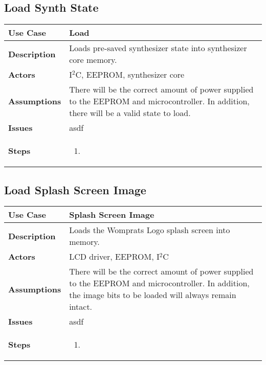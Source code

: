 \documentclass{article}
\begin{document}
\subsection{Load Synth State}
\begin{tabular}{|p{1in}|p{5in}|}
\hline
\textbf{Use Case} & Load\\
\hline
\textbf{Description} & Loads pre-saved synthesizer state into synthesizer core memory.\\
\hline
\textbf{Actors} & I$^{2}$C, EEPROM, synthesizer core\\
\hline
\textbf{Assumptions} & There will be the correct amount of power supplied to the EEPROM and microcontroller.  In addition, there will be a valid state to load.\\
\hline
\textbf{Issues} & asdf\\
\hline
\textbf{Steps} & \begin{enumerate}
\item
\end{enumerate}\\
\hline
\end{tabular}

\subsection{Load Splash Screen Image}
\begin{tabular}{|p{1in}|p{5in}|}
\hline
\textbf{Use Case} & Splash Screen Image\\
\hline
\textbf{Description} & Loads the Womprats Logo splash screen into memory.\\
\hline
\textbf{Actors} & LCD driver, EEPROM, I$^2$C\\
\hline
\textbf{Assumptions} & There will be the correct amount of power supplied to the EEPROM and microcontroller.  In addition, the image bits to be loaded will always remain intact.\\
\hline
\textbf{Issues} & asdf\\
\hline
\textbf{Steps} & \begin{enumerate}
\item
\end{enumerate}\\
\hline
\end{tabular}
\end{document}
